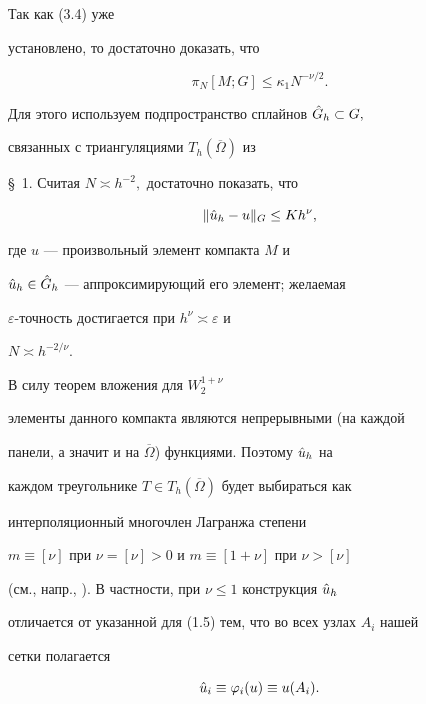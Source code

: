 \begin{pf} Так как (3.4) уже


установлено, то достаточно доказать, что


\begin{equation}


\pi_N[M;G]\le \kappa_1N^{-\nu/2}.


\end{equation}


Для этого используем подпространство сплайнов $\Hat G_h\subset G,$


связанных с триангуляциями $T_h(\overline\Omega)$ из


\S~1. Считая $N\asymp h^{-2},$ достаточно показать, что


\begin{equation}


\|\Hat u_h-u\|_G\le Kh^{\nu},


\end{equation}


где $u$ --- произвольный элемент компакта $M$ и


$\Hat u_h\in \Hat G_h$ --- аппрокси\-мирующий его элемент; желаемая


$\varepsilon$-точность достигается при $h^{\nu}\asymp\varepsilon$ и


$N\asymp h^{-2/{\nu}}.$





В силу теорем вложения для $W_2^{1+\nu}$


элементы данного компакта являются непрерывными (на каждой


панели, а значит и на $\overline\Omega$) функциями. Поэтому $\Hat u_h$ на


каждом треугольнике $T\in T_h(\overline \Omega)$ будет выбираться как


интерполяционный многочлен Лагранжа степени


$m\equiv [\nu]$ при $\nu=[\nu]>0$ и $m\equiv [1+\nu]$ при $\nu>[\nu]$


(см., напр., \cite{Dy1}). В частности, при $\nu\le 1$ конструкция $\Hat u_h$


отличается от указанной для (1.5) тем, что во всех узлах $A_i$ нашей


сетки полагается


\begin{equation}


\Hat u_i\equiv\varphi_i(u)\equiv u(A_i).


\end{equation}



\end{pf}

